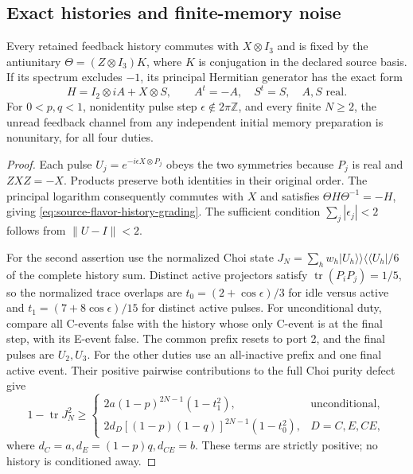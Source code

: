 \subsection{Exact histories and finite-memory noise}
\label{subsec:source-flavor-histories}

\begin{proposition}
\label{prop:source-flavor-histories}
Every retained feedback history commutes with \(X\otimes I_3\) and is fixed
by the antiunitary \(\Theta=(Z\otimes I_3)K\), where \(K\) is conjugation
in the declared source basis. If its spectrum excludes \(-1\), its
principal Hermitian generator has the exact form
\begin{equation}
 H=I_2\otimes iA+X\otimes S,\qquad
 A^t=-A,\quad S^t=S,\quad A,S\text{ real}.
 \label{eq:source-flavor-history-grading}
\end{equation}
For \(0<p,q<1\), nonidentity pulse step
\(\epsilon\notin2\pi\mathbb Z\), and every finite \(N\ge2\), the unread
feedback channel from any independent initial memory preparation is
nonunitary, for all four duties.
\end{proposition}
\begin{proof}
Each pulse \(U_j=e^{-i\epsilon X\otimes P_j}\) obeys the two symmetries
because \(P_j\) is real and \(ZXZ=-X\). Products preserve both identities
in their original order. The principal logarithm consequently commutes
with \(X\) and satisfies \(\Theta H\Theta^{-1}=-H\), giving
\eqref{eq:source-flavor-history-grading}. The sufficient condition
\(\sum_j|\epsilon_j|<2\) follows from \(\|U-I\|<2\).

For the second assertion use the normalized Choi state
\(J_N=\sum_h w_h|U_h\rangle\!\rangle\langle\!\langle U_h|/6\)
of the complete history sum. Distinct active projectors satisfy
\(\operatorname{tr}(P_iP_j)=1/5\), so the normalized trace overlaps are
\(t_0=(2+\cos\epsilon)/3\) for idle versus active and
\(t_1=(7+8\cos\epsilon)/15\) for distinct active pulses.
For unconditional duty, compare all C-events false with the history whose
only C-event is at the final step, with its E-event false. The common
prefix resets to port 2, and the final pulses are \(U_2,U_3\). For the
other duties use an all-inactive prefix and one final active event. Their
positive pairwise contributions to the full Choi purity defect give
\begin{equation}
 1-\operatorname{tr}J_N^2\ge
 \begin{cases}
 2a(1-p)^{2N-1}(1-t_1^2),&\text{unconditional},\\
 2d_D[(1-p)(1-q)]^{2N-1}(1-t_0^2),&D=C,E,CE,
 \end{cases}
 \label{eq:source-flavor-finite-noise}
\end{equation}
where \(d_C=a,d_E=(1-p)q,d_{CE}=b\). These terms are strictly positive;
no history is conditioned away.
\end{proof}

